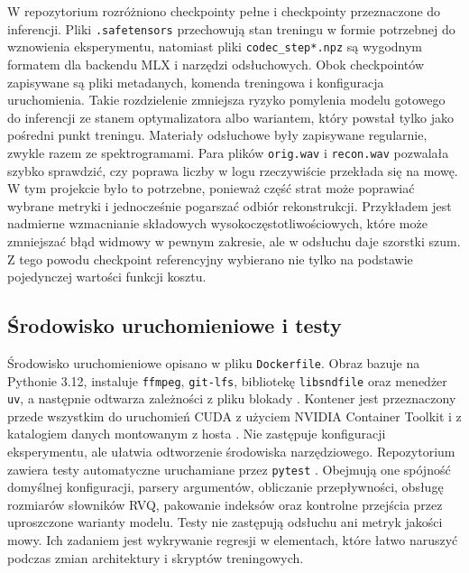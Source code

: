 W repozytorium rozróżniono checkpointy pełne i checkpointy przeznaczone do inferencji. Pliki \texttt{.safetensors} przechowują stan treningu w formie potrzebnej do wznowienia eksperymentu, natomiast pliki \texttt{codec\_step*.npz} są wygodnym formatem dla backendu MLX i narzędzi odsłuchowych. Obok checkpointów zapisywane są pliki metadanych, komenda treningowa i konfiguracja uruchomienia. Takie rozdzielenie zmniejsza ryzyko pomylenia modelu gotowego do inferencji ze stanem optymalizatora albo wariantem, który powstał tylko jako pośredni punkt treningu. Materiały odsłuchowe były zapisywane regularnie, zwykle razem ze spektrogramami. Para plików \texttt{orig.wav} i \texttt{recon.wav} pozwalała szybko sprawdzić, czy poprawa liczby w logu rzeczywiście przekłada się na mowę. W tym projekcie było to potrzebne, ponieważ część strat może poprawiać wybrane metryki i jednocześnie pogarszać odbiór rekonstrukcji. Przykładem jest nadmierne wzmacnianie składowych wysokoczęstotliwościowych, które może zmniejszać błąd widmowy w pewnym zakresie, ale w odsłuchu daje szorstki szum. Z tego powodu checkpoint referencyjny wybierano nie tylko na podstawie pojedynczej wartości funkcji kosztu.

\newpage

\subsection{Środowisko uruchomieniowe i testy}

Środowisko uruchomieniowe opisano w pliku \texttt{Dockerfile}. Obraz bazuje na Pythonie 3.12, instaluje \texttt{ffmpeg}, \texttt{git-lfs}, bibliotekę \texttt{libsndfile} oraz menedżer \texttt{uv}, a następnie odtwarza zależności z pliku blokady \cite{Docker2026DockerfileReference,FFmpeg2026Documentation,GitLFS2026Documentation,LibSndFile2026Documentation,Astral2026Uv}. Kontener jest przeznaczony przede wszystkim do uruchomień CUDA z użyciem NVIDIA Container Toolkit i z katalogiem danych montowanym z hosta \cite{Nvidia2026ContainerToolkit}. Nie zastępuje konfiguracji eksperymentu, ale ułatwia odtworzenie środowiska narzędziowego. Repozytorium zawiera testy automatyczne uruchamiane przez \texttt{pytest} \cite{Pytest2026Documentation}. Obejmują one spójność domyślnej konfiguracji, parsery argumentów, obliczanie przepływności, obsługę rozmiarów słowników RVQ, pakowanie indeksów oraz kontrolne przejścia przez uproszczone warianty modelu. Testy nie zastępują odsłuchu ani metryk jakości mowy. Ich zadaniem jest wykrywanie regresji w elementach, które łatwo naruszyć podczas zmian architektury i skryptów treningowych.


